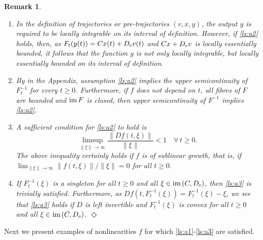 \documentclass[a4paper,11pt]{article}
\numberwithin{equation}{section}
\numberwithin{figure}{section}
\numberwithin{table}{section}
\newtheorem{remark}[theorem]{Remark}
\begin{document}
\begin{remark}\label{rem:assumptions}
\begin{rm}
\begin{enumerate}[label = {\bf (\alph*)}, ref={\rm (\alph*)}, leftmargin = 0ex, itemindent = 4.6ex]
\item\label{ls:rem_assumptions_s_1}
In the definition of trajectories or pre-trajectories $(v,x,y)$, the output $y$ is required
to be locally integrable on its interval of definition. However, if \ref{ls:a2} holds, then, as
$F_t(y(t))=Cx(t)+D_{\rm e}v(t)$ and $Cx+D_{\rm e}v$ is locally essentially bounded, it follows
that the function $y$ is not only locally integrable, but locally essentially bounded on its interval of definition.

\item\label{ls:rem_assumptions_s_2}
By  in the Appendix, assumption \ref{ls:a2} implies the upper semicontinuity of $F_t^{-1}$ for every $t\geq 0$. Furthermore, if $f$ does not depend on $t$, all fibres of $F$ are bounded and ${\rm im}\,F$ is closed, then upper semicontinuity of $F^{-1}$
implies \ref{ls:a2}.
%
\item \label{ls:rem_assumptions_s_3}
A sufficient condition for \ref{ls:a2} to hold is
\[
\limsup_{\|\xi\|\to\infty}\frac{\|Df(t,\xi)\|}{\|\xi\|}<1\quad\forall\,t\geq 0.
\]
The above inequality certainly holds if $f$ is of sublinear growth, that is, if $\lim_{\|\xi\|\to\infty}\|f(t,\xi)\|/\|\xi\|=0$ for all $t\geq 0$.
%
\item \label{ls:rem_assumptions_s_4}
If $F_t^{-1}(\xi)$ is a singleton for all $t\geq 0$ and all $\xi \in {\rm im}\,(C,D_{\rm e})$, then \ref{ls:a3} is trivially satisfied. Furthermore, as
$Df(t,F_t^{-1}(\xi))=F_t^{-1}(\xi)-\xi$, we see that \ref{ls:a3} holds if
$D$ is left invertible and $F_t^{-1}(\xi)$ is convex for all $t\geq 0$ and all $\xi
\in {\rm im}\,(C,D_{\rm e})$.
\hfill$\Diamond$
\end{enumerate}
\end{rm}
\end{remark}
%
Next we present examples of nonlinearities $f$ for which \ref{ls:a1}-\ref{ls:a3} are satisfied.
%
\end{document}
